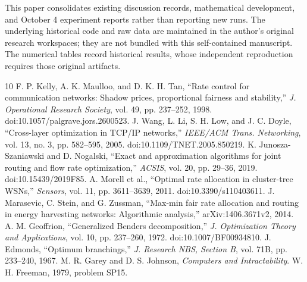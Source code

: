 \documentclass[conference,letterpaper]{IEEEtran}
\begin{document}
This paper consolidates existing discussion records, mathematical development, and October 4 experiment reports rather than reporting new runs. The underlying historical code and raw data are maintained in the author's original research workspaces; they are not bundled with this self-contained manuscript. The numerical tables record historical results, whose independent reproduction requires those original artifacts.

\begin{thebibliography}{10}
 F. P. Kelly, A. K. Maulloo, and D. K. H. Tan, ``Rate control for communication networks: Shadow prices, proportional fairness and stability,'' \emph{J. Operational Research Society}, vol. 49, pp. 237--252, 1998. doi:10.1057/palgrave.jors.2600523.
 J. Wang, L. Li, S. H. Low, and J. C. Doyle, ``Cross-layer optimization in TCP/IP networks,'' \emph{IEEE/ACM Trans. Networking}, vol. 13, no. 3, pp. 582--595, 2005. doi:10.1109/TNET.2005.850219.
 K. Junosza-Szaniawski and D. Nogalski, ``Exact and approximation algorithms for joint routing and flow rate optimization,'' \emph{ACSIS}, vol. 20, pp. 29--36, 2019. doi:10.15439/2019F85.
 A. Morell et al., ``Optimal rate allocation in cluster-tree WSNs,'' \emph{Sensors}, vol. 11, pp. 3611--3639, 2011. doi:10.3390/s110403611.
 J. Marasevic, C. Stein, and G. Zussman, ``Max-min fair rate allocation and routing in energy harvesting networks: Algorithmic analysis,'' arXiv:1406.3671v2, 2014.
 A. M. Geoffrion, ``Generalized Benders decomposition,'' \emph{J. Optimization Theory and Applications}, vol. 10, pp. 237--260, 1972. doi:10.1007/BF00934810.
 J. Edmonds, ``Optimum branchings,'' \emph{J. Research NBS, Section B}, vol. 71B, pp. 233--240, 1967.
 M. R. Garey and D. S. Johnson, \emph{Computers and Intractability}. W. H. Freeman, 1979, problem SP15.
\end{thebibliography}
\end{document}
